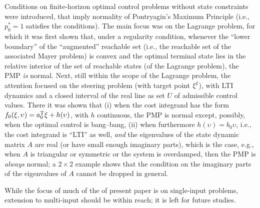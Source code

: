 \documentclass[letterpaper,10pt,conference]{ieeeconf}
\begin{document}
Conditions 
on finite-horizon optimal control problems without state constraints
were introduced, that imply normality of
Pontryagin's Maximum Principle (i.e., $p_0^*=1$ satisfies the conditions).
The main focus was on the Lagrange problem, for which it was first shown that,
under a regularity condition, whenever the ``lower boundary'' of the
``augmented'' reachable set (i.e., the reachable set of the associated
Mayer problem) is convex and the optimal terminal state lies in the
relative interior of the set of reachable states (of the Lagrange problem), 
the PMP {\em is} normal.  
Next, still within the scope 
of the Lagrange problem, the attention focused on the steering problem
(with target point $\xi^{\rm f}$), with LTI dynamics and a closed
interval of the real line as set $U$ of admissible control values.
There it was shown that (i) when the cost integrand has the form 
$f_0(\xi,\upsilon)=a_0^{\rm T}\xi+h(\upsilon)$, with $h$ continuous,
the PMP is normal 
except, possibly, when the optimal control is bang--bang, 
(ii) when furthermore $h(\upsilon)=b_0\upsilon$, i.e.,
the cost integrand is ``LTI'' as well, {\em and} the eigenvalues of the
state dynamic matrix $A$ are real (or have small enough imaginary parts), 
which is the case, e.g., when $A$ is triangular or symmetric or the system 
is overdamped, then 
the PMP is {\em always} normal;
a $2\times 2$ example shows that the condition on the imaginary parts
of the eigenvalues of $A$ cannot be dropped in general.

While the focus of much of the of present paper is on single-input problems,
extension to multi-input should be within reach; it is left for future
studies.
% 

\end{document}

